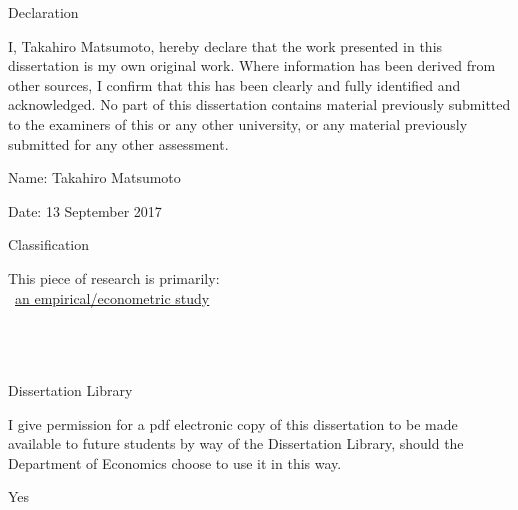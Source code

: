 \begin{center}
\large Declaration
\end{center}

\vspace{0.5cm}
\indent I, Takahiro Matsumoto, hereby declare that the work presented in this dissertation is my own original work. Where information has been derived from other sources, I confirm that this has been clearly and fully identified and acknowledged.  No part of this dissertation contains material previously submitted to the examiners of this or any other university, or any material previously submitted for any other assessment.

\vspace{1.0cm}

Name: Takahiro Matsumoto

\vspace{0.5cm}

Date: 13 September 2017

\vspace{1.5cm}

\begin{center}
\large Classification
\end{center}

\vspace{0.5cm}

This piece of research is primarily:\\
\indent \hspace{0.3cm} \CheckedBox \, \uline {an empirical/econometric study}\\
\indent \hspace{0.3cm} \Box \,\,	\\
\indent \hspace{0.4cm} \Box \,\,	\\
\indent \hspace{0.4cm} \Box \,\,	\\

\vspace{1.5cm}


\begin{center}
\large Dissertation Library
\end{center}

\indent I give permission for a pdf electronic copy of this dissertation to be made available to future students by way of the Dissertation Library, should the Department of Economics choose to use it in this way. 

\vspace{0.5cm}

\begin{center}
Yes
\end{center}